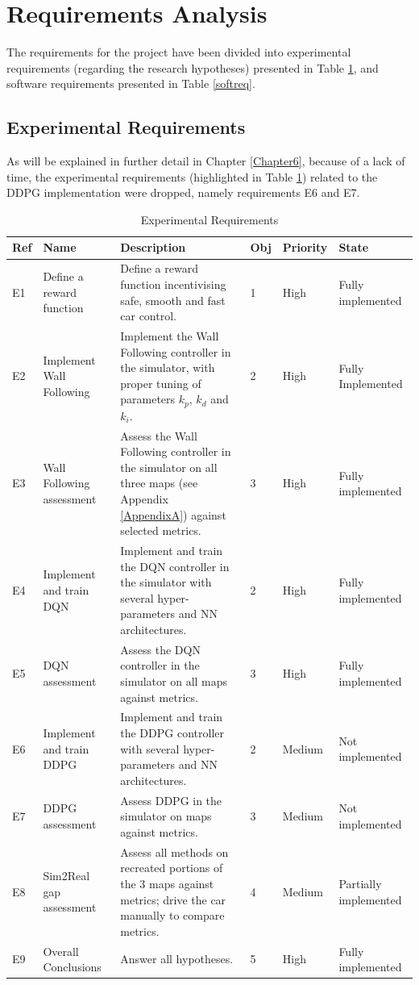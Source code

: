 \section{Requirements Analysis}
\label{reqana}

The requirements for the project have been divided into experimental requirements (regarding the research hypotheses) presented in Table \ref{expreqtab}, and software requirements presented in Table \ref{softreq}.

\subsection{Experimental Requirements}
\label{expreq}

As will be explained in further detail in Chapter \ref{Chapter6}, because of a lack of time, the experimental requirements (highlighted in Table \ref{expreqtab}) related to the DDPG implementation were dropped, namely requirements E6 and E7.

\begin{table}
\centering
\begin{tabularx}{\textwidth}{||l|X|X|l|l|X||}
 \hline
 Ref & Name & Description & Obj & Priority & State\\ [0.5ex]
 \hline\hline
 E1 & Define a reward function & Define a reward function incentivising safe, smooth and fast car control. & 1 & High & Fully implemented \\
 \hline
 E2 & Implement Wall Following & Implement the Wall Following controller in the simulator, with proper tuning of parameters $k_p$, $k_d$ and $k_i$. & 2 & High & Fully Implemented \\
 \hline
 E3 & Wall Following assessment & Assess the Wall Following controller in the simulator on all three maps (see Appendix \ref{AppendixA}) against selected metrics. & 3 & High & Fully implemented\\
 \hline
 E4 & Implement and train DQN & Implement and train the DQN controller in the simulator with several hyper-parameters and NN architectures. & 2 & High & Fully implemented \\
 \hline
 E5 & DQN assessment & Assess the DQN controller in the simulator on all maps against metrics. & 3 & High & Fully implemented\\ [1ex]
  \hline
 E6 & Implement and train DDPG & Implement and train the DDPG controller with several hyper-parameters and NN architectures. & 2 & Medium & Not implemented\\
  \hline
 E7 & DDPG assessment & Assess DDPG in the simulator on maps against metrics. & 3 & Medium & Not implemented\\ 
 \hline
 E8 & Sim2Real gap assessment & Assess all methods on recreated portions of the 3 maps against metrics; drive the car manually to compare metrics. & 4 & Medium & Partially implemented\\
  \hline
 E9 & Overall Conclusions & Answer all hypotheses. & 5 & High & Fully implemented\\ [1ex]
  \hline
\end{tabularx}
\caption{Experimental Requirements}
\label{expreqtab}
\end{table}

